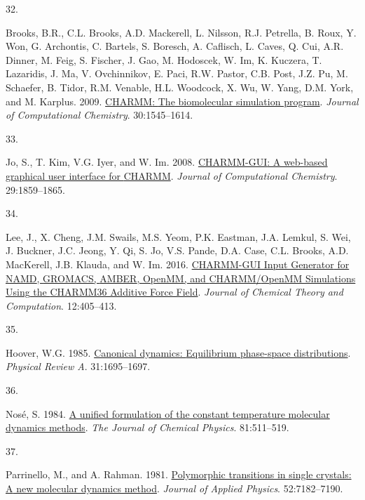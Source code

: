 \documentclass[
  letterpaper,
  DIV=11,
  numbers=noendperiod]{scrartcl}
\newlength{\cslhangindent}
\newlength{\csllabelwidth}
\newlength{\cslentryspacingunit} %
\newenvironment{CSLReferences}[2] %
 {%
  \setlength{\parindent}{0pt}
  \ifodd #1
  \let\oldpar\par
  \def\par{\hangindent=\cslhangindent\oldpar}
  \fi
  \setlength{\parskip}{#2\cslentryspacingunit}
 }%
 {}
\newcommand{\CSLLeftMargin}[1]{\parbox[t]{\csllabelwidth}{#1}}
\newcommand{\CSLRightInline}[1]{\parbox[t]{\linewidth - \csllabelwidth}{#1}\break}
\begin{document}
\begin{CSLReferences}{0}{0}
\leavevmode{}%
\CSLLeftMargin{32. }%
\CSLRightInline{Brooks, B.R., C.L. Brooks, A.D. Mackerell, L. Nilsson,
R.J. Petrella, B. Roux, Y. Won, G. Archontis, C. Bartels, S. Boresch, A.
Caflisch, L. Caves, Q. Cui, A.R. Dinner, M. Feig, S. Fischer, J. Gao, M.
Hodoscek, W. Im, K. Kuczera, T. Lazaridis, J. Ma, V. Ovchinnikov, E.
Paci, R.W. Pastor, C.B. Post, J.Z. Pu, M. Schaefer, B. Tidor, R.M.
Venable, H.L. Woodcock, X. Wu, W. Yang, D.M. York, and M. Karplus. 2009.
\href{https://doi.org/10.1002/jcc.21287}{{CHARMM}: {The} biomolecular
simulation program}. \emph{Journal of Computational Chemistry}.
30:1545--1614.}

\leavevmode{}%
\CSLLeftMargin{33. }%
\CSLRightInline{Jo, S., T. Kim, V.G. Iyer, and W. Im. 2008.
\href{https://doi.org/10.1002/jcc.20945}{{CHARMM-GUI}: A web-based
graphical user interface for {CHARMM}}. \emph{Journal of Computational
Chemistry}. 29:1859--1865.}

\leavevmode{}%
\CSLLeftMargin{34. }%
\CSLRightInline{Lee, J., X. Cheng, J.M. Swails, M.S. Yeom, P.K. Eastman,
J.A. Lemkul, S. Wei, J. Buckner, J.C. Jeong, Y. Qi, S. Jo, V.S. Pande,
D.A. Case, C.L. Brooks, A.D. MacKerell, J.B. Klauda, and W. Im. 2016.
\href{https://doi.org/10.1021/acs.jctc.5b00935}{{CHARMM-GUI Input
Generator} for {NAMD}, {GROMACS}, {AMBER}, {OpenMM}, and
{CHARMM}/{OpenMM Simulations Using} the {CHARMM36 Additive Force
Field}}. \emph{Journal of Chemical Theory and Computation}.
12:405--413.}

\leavevmode{}%
\CSLLeftMargin{35. }%
\CSLRightInline{Hoover, W.G. 1985.
\href{https://doi.org/10.1103/PhysRevA.31.1695}{Canonical dynamics:
{Equilibrium} phase-space distributions}. \emph{Physical Review A}.
31:1695--1697.}

\leavevmode{}%
\CSLLeftMargin{36. }%
\CSLRightInline{Nosé, S. 1984. \href{https://doi.org/10.1063/1.447334}{A
unified formulation of the constant temperature molecular dynamics
methods}. \emph{The Journal of Chemical Physics}. 81:511--519.}

\leavevmode{}%
\CSLLeftMargin{37. }%
\CSLRightInline{Parrinello, M., and A. Rahman. 1981.
\href{https://doi.org/10.1063/1.328693}{Polymorphic transitions in
single crystals: {A} new molecular dynamics method}. \emph{Journal of
Applied Physics}. 52:7182--7190.}


\end{CSLReferences}
\end{document}
